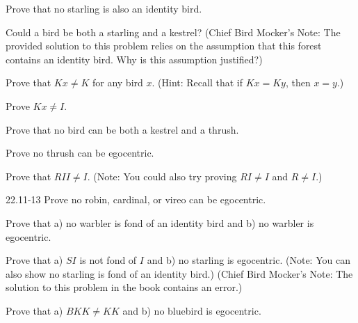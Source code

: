 \documentclass[12pt, letterpaper]{article}
\begin{document}
\begin{prob}{22.4}  
Prove that no starling is also an identity bird.
\end{prob}

\begin{prob}{22.5}  
Could a bird be both a starling and a kestrel? (Chief Bird Mocker's Note: The provided solution to this problem relies on the assumption that this forest contains an identity bird. Why is this assumption justified?)
\end{prob}

\begin{prob}{22.6}  
Prove that $Kx \neq K$ for any bird $x$. (Hint: Recall that if $Kx = Ky$, then $x = y$.)
\end{prob}

\begin{prob}{22.7}  
Prove $Kx \neq I$.
\end{prob}

\begin{prob}{22.8}  
Prove that no bird can be both a kestrel and a thrush.
\end{prob}

\begin{prob}{22.9}  
Prove no thrush can be egocentric.
\end{prob}

\begin{prob}{22.10} 
Prove that $RII \neq I$. (Note: You could also try proving $RI \neq I$ and $R \neq I$.)
\end{prob}

\begin{prob}{22.11-13} 
Prove no robin, cardinal, or vireo can be egocentric.
\end{prob}

\begin{prob}{22.14} 
Prove that a) no warbler is fond of an identity bird and b) no warbler is egocentric.
\end{prob}

\begin{prob}{22.15}
Prove that a) $SI$ is not fond of $I$ and b) no starling is egocentric. (Note: You can also show no starling is fond of an identity bird.) (Chief Bird Mocker's Note: The solution to this problem in the book contains an error.)
\end{prob}

\begin{prob}{22.16} 
Prove that a) $BKK \neq KK$ and b) no bluebird is egocentric.
\end{prob}
\end{document}
